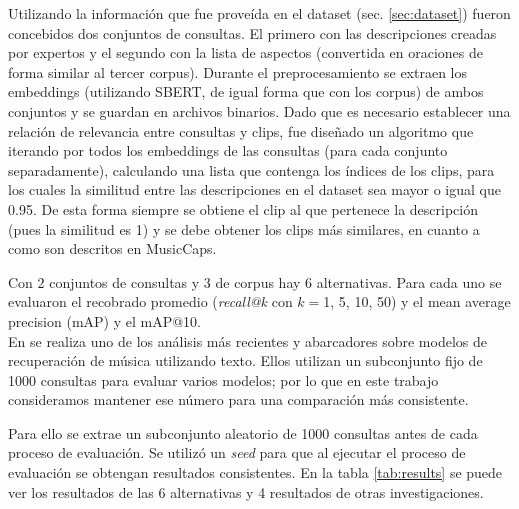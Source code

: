 Utilizando la información que fue proveída en el dataset (sec. \ref{sec:dataset}) fueron concebidos dos conjuntos de consultas. El primero con las descripciones creadas por expertos y el segundo con la lista de aspectos (convertida en oraciones de forma similar al tercer corpus). Durante el preprocesamiento se extraen los embeddings (utilizando SBERT, de igual forma que con los corpus) de ambos conjuntos y se guardan en archivos binarios. Dado que es necesario establecer una relación de relevancia entre consultas y clips, fue diseñado un algoritmo que iterando por todos los embeddings de las consultas (para cada conjunto separadamente), calculando una lista que contenga los índices de los clips, para los cuales la similitud entre las descripciones en el dataset sea mayor o igual que 0.95. De esta forma siempre se obtiene el clip al que pertenece la descripción (pues la similitud es 1) y se debe obtener los clips más similares, en cuanto a como son descritos en MusicCaps.

Con 2 conjuntos de consultas y 3 de corpus hay 6 alternativas. Para cada uno se evaluaron el recobrado promedio (\textit{recall@k} con $k=$1, 5, 10, 50) y el mean average precision (mAP) y el mAP@10. \\
En \cite{Doh2022TowardUT} se realiza uno de los análisis más recientes y abarcadores sobre modelos de recuperación de música utilizando texto. Ellos utilizan un subconjunto fijo de 1000 consultas para evaluar varios modelos; por lo que en este trabajo consideramos mantener ese número para una comparación más consistente.

Para ello se extrae un subconjunto aleatorio de 1000 consultas antes de cada proceso de evaluación. Se utilizó un \textit{seed} para que al ejecutar el proceso de evaluación se obtengan resultados consistentes. En la tabla \ref{tab:results} se puede ver los resultados de las 6 alternativas y 4 resultados de otras investigaciones.


